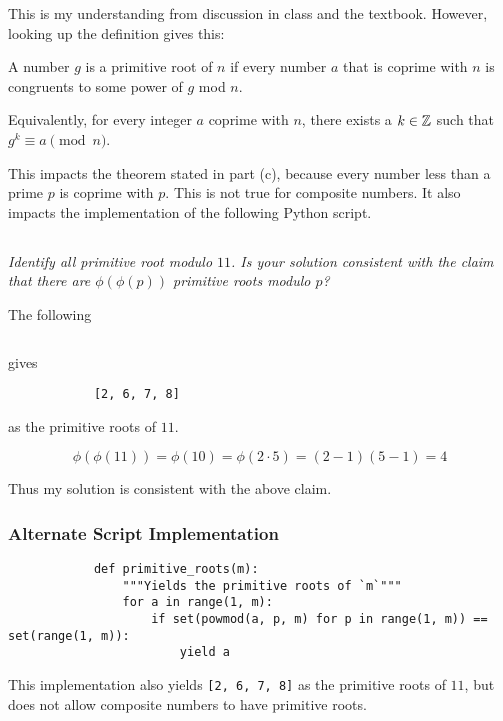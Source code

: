 \documentclass[12pt]{article}
\begin{document}
        This is my understanding from discussion in class and the textbook. However, looking up the definition gives this:

        \begin{defn}
            A number $g$ is a primitive root of $n$ if every number $a$ that is coprime with $n$ is congruents to some power of $g$ mod $n$.

            Equivalently, for every integer $a$ coprime with $n$, there exists a $k \in \mathbb{Z}$ such that $g^k \equiv a \pmod{n}$.
        \end{defn}

        This impacts the theorem stated in part (c), because every number less than a prime $p$ is coprime with $p$. This is not true for composite numbers. It also impacts the implementation of the following Python script.

    \subsection{} \textit{Identify all primitive root modulo $11$. Is your solution consistent with the claim that there are $\phi(\phi(p))$ primitive roots modulo $p$?}

        The following
        \inputminted{python}{hw2_6.py}
        gives
        \begin{verbatim}
            [2, 6, 7, 8]
        \end{verbatim}
        as the primitive roots of $11$.

        $$\phi(\phi(11)) = \phi(10) = \phi(2 \cdot 5) = (2 - 1)(5 - 1) = 4$$

        Thus my solution is consistent with the above claim.

        \subsubsection{Alternate Script Implementation}
        \begin{verbatim}
            def primitive_roots(m):
                """Yields the primitive roots of `m`"""
                for a in range(1, m):
                    if set(powmod(a, p, m) for p in range(1, m)) == set(range(1, m)):
                        yield a
        \end{verbatim}

        This implementation also yields \texttt{[2, 6, 7, 8]} as the primitive roots of $11$, but does not allow composite numbers to have primitive roots.
\end{document}
